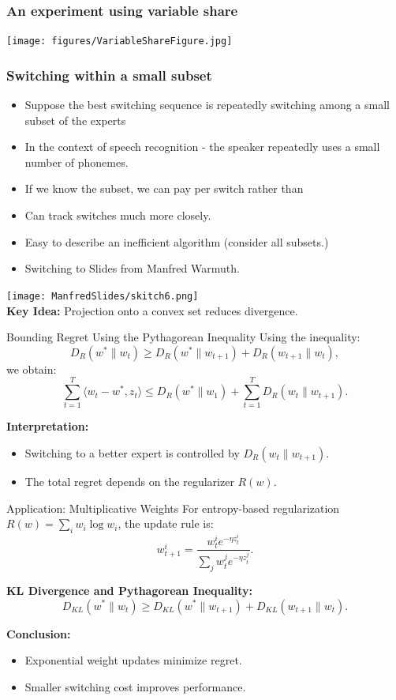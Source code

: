 \documentclass[handout]{beamer}
\begin{document}
\begin{frame}
\frametitle{An experiment using variable share}
\texttt{[image: figures/VariableShareFigure.jpg]}
\end{frame}

\begin{frame}
\frametitle{Switching within a small subset}
\begin{itemize}
\item Suppose the best switching sequence is repeatedly switching among a small subset of the experts
\item In the context of speech recognition - the speaker repeatedly uses a small number of phonemes.
\item If we know the subset, we can pay  per switch rather than 
\item Can track switches much more closely.
\item Easy to describe an inefficient algorithm (consider all  subsets.)
\item Switching to Slides from Manfred Warmuth.
\end{itemize}
\end{frame}

\begin{frame}
\texttt{[image: ManfredSlides/skitch6.png]}
\\
\textbf{Key Idea:} \textcolor{mathcolor}{Projection onto a convex set reduces divergence}.
\end{frame}

\begin{frame}{Bounding Regret Using the Pythagorean Inequality}
Using the inequality:
\[
D_R(w^* \| w_t) \geq D_R(w^* \| w_{t+1}) + D_R(w_{t+1} \| w_t),
\]
we obtain:
\[
\sum_{t=1}^{T} \langle w_t - w^*, z_t \rangle \leq D_R(w^* \| w_1) + \sum_{t=1}^{T} D_R(w_t \| w_{t+1}).
\]

\textbf{Interpretation:}
\begin{itemize}
    \item \textcolor{mathcolor}{Switching to a better expert is controlled} by \( D_R(w_t \| w_{t+1}) \).
    \item \textcolor{mathcolor}{The total regret depends on the regularizer \( R(w) \)}.
\end{itemize}
\end{frame}

\begin{frame}{Application: Multiplicative Weights}
For entropy-based regularization \( R(w) = \sum_i w_i \log w_i \), the update rule is:
\[
w_{t+1}^i = \frac{w_t^i e^{-\eta z_t^i}}{\sum_j w_t^j e^{-\eta z_t^j}}.
\]

\textbf{KL Divergence and Pythagorean Inequality:}
\[
D_{KL}(w^* \| w_t) \geq D_{KL}(w^* \| w_{t+1}) + D_{KL}(w_{t+1} \| w_t).
\]

\textbf{Conclusion:} 
\begin{itemize}
    \item \textcolor{mathcolor}{Exponential weight updates minimize regret}.
    \item \textcolor{mathcolor}{Smaller switching cost improves performance}.
\end{itemize}
\end{frame}
\end{document}
